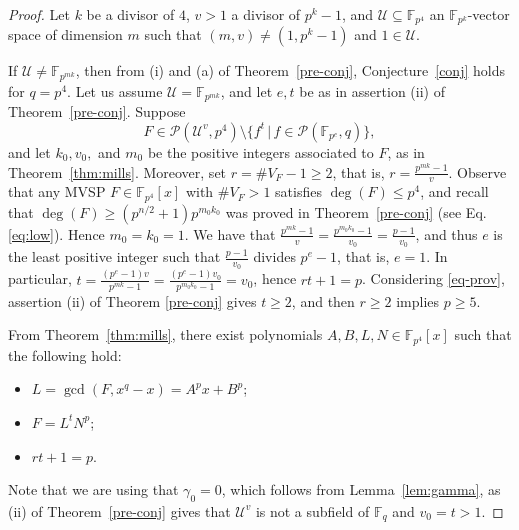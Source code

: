 \documentclass[11pt]{amsart}
\newcommand{\F}{\mathbb{F}}
\newcommand{\pp}{\mathcal P}
\theoremstyle{definition}
\theoremstyle{remark}
\begin{document}
\begin{proof}
Let $k$ be a divisor of $4$, $v>1$  a divisor of $p^k-1$, and  $\mathcal U\subseteq \F_{p^4}$  an $\F_{p^k}$-vector space of dimension $m$ such that $(m, v)\ne (1, p^k-1)$ and $1\in\mathcal U$. 


If $\mathcal U\neq \F_{p^{mk}}$, then from  (i) and (a) of Theorem~\ref{pre-conj},  Conjecture~\ref{conj} holds for $q=p^4$.  Let us assume  $\mathcal U=\F_{p^{mk}}$, and let $e, t$ be as in assertion (ii) of Theorem~\ref{pre-conj}. Suppose 
\begin{equation}\label{eq-prov}
F\in \mathcal P(\mathcal U^v, p^4)\setminus \{ f^{t}\,|\, f\in \pp(\F_{p^e}, q)\},
\end{equation}
 and let $k_0, v_0,$ and  $m_0$ be the positive integers associated to $F$, as in Theorem~\ref{thm:mills}. Moreover, set $r=\# V_F-1\ge 2$, that is, $r=\frac{p^{mk}-1}{v}$. Observe that any MVSP $F\in \F_{p^4}[x]$ with $\#V_F>1$ satisfies $\deg(F)\le p^4$, and 
recall that $\deg(F)\ge (p^{n/2}+1)p^{m_0k_0}$ was proved in Theorem~\ref{pre-conj} (see Eq. \eqref{eq:low}). Hence $m_0=k_0=1$. We have that $\frac{p^{mk}-1}{v}=\frac{p^{m_0k_0}-1}{v_0}=\frac{p-1}{v_0}$,  and thus $e$ is the least positive integer such that $\frac{p-1}{v_0} $ divides $p^e-1$, that is, $e=1$. In particular, $t=\frac{(p^e-1)v}{p^{mk}-1}=\frac{(p^e-1)v_0}{p^{m_0k_0}-1}=v_0$,  hence $rt+1=p$. Considering \eqref{eq-prov}, assertion (ii) of  Theorem \ref{pre-conj} gives $t\ge 2$, and then  $ r\ge 2$  implies $p\ge 5$. 

From Theorem~\ref{thm:mills}, there exist polynomials $A, B, L, N\in \F_{p^4}[x]$ such that the following hold:
\begin{itemize}%
\item $L=\gcd(F,x^q-x)=A^px+B^p$;
\item $F=L^tN^p$;
\item  $rt+1=p$.
\end{itemize}
Note that  we are using that $\gamma_0=0$, which  follows from Lemma~\ref{lem:gamma}, as  (ii) of Theorem~\ref{pre-conj} gives that $\mathcal{U}^v$  is not a subfield of $\mathbb{F}_q$ and  $v_0=t>1$.


\end{proof}
\end{document}
